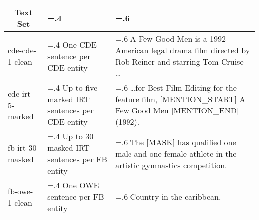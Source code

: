 \begin{tabularx}{\textwidth}{| l | >{\hsize=.4\hsize}X | >{\hsize=.6\hsize}X |}
    \hline
    
    \multicolumn{1}{|c|}{\textbf{Text Set}} &
    \multicolumn{1}{|c|}{\textbf{Description}} &
    \multicolumn{1}{|c|}{\textbf{Example}} \\ 
    
    \hline \hline
    
    cde-cde-1-clean & One CDE sentence per CDE entity &
    A Few Good Men is a 1992 American legal drama film directed by Rob Reiner and starring Tom Cruise \dots \\ \hline
    
    cde-irt-5-marked & Up to five marked IRT sentences per CDE entity &
    \dots for Best Film Editing for the feature film, [MENTION\_START] A Few Good Men [MENTION\_END] (1992). \\ \hline
    
    fb-irt-30-masked & Up to 30 masked IRT sentences per FB entity &
    The [MASK] has qualified one male and one female athlete in the artistic gymnastics competition. \\ \hline
    
    fb-owe-1-clean & One OWE sentence per FB entity &
    Country in the caribbean. \\ \hline

\end{tabularx}
